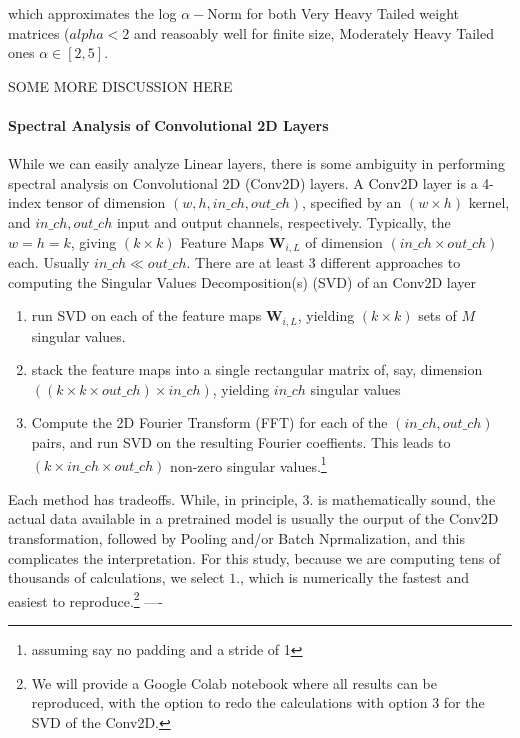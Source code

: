 which approximates the log $\alpha-$Norm for both Very Heavy Tailed weight matrices ($alpha < 2$  and reasoably well for finite size, Moderately Heavy Tailed ones $\alpha\in[2,5]$.  


SOME MORE DISCUSSION HERE

\paragraph{Spectral Analysis of Convolutional 2D Layers}
While we can easily analyze Linear layers, there is some ambiguity in performing spectral analysis on Convolutional 2D (Conv2D) layers.  A Conv2D layer is a 4-index tensor of dimension $(w,h,in\_ch,out\_ch)$, specified by an $(w\times h)$ kernel, and $in\_ch,out\_ch$ input and output channels, respectively.  Typically, the $w=h=k$, giving $(k\times k)$ Feature Maps $\mathbf{W}_{i,L}$
of dimension $(in\_ch\times out\_ch)$ each.  Usually $in\_ch\ll out\_ch$.
There are at least 3 different approaches to computing the Singular Values Decomposition(s) (SVD) of an Conv2D layer
\begin{enumerate}
\item run SVD on each of the feature maps $\mathbf{W}_{i,L}$, yielding $(k\times k)$ sets of $M$ singular values. 
\item stack the feature maps into a single rectangular matrix of, say, dimension $((k\times k\times out\_ch)\times in\_ch)$, yielding $in\_ch$ singular values
\item Compute the 2D Fourier Transform (FFT) for each of the $(in\_ch, out\_ch)$ pairs, and run SVD on the resulting Fourier coeffients\cite{Long2019}.  This leads to $(k\times in\_ch\times out\_ch)$ non-zero singular values.\footnote{assuming say no padding and a stride of 1}
\end{enumerate}

Each method has tradeoffs.  While, in principle, 3. is mathematically sound, the actual data available
in a pretrained model is usually the ourput of the Conv2D transformation, followed by Pooling and/or Batch Nprmalization,
and this complicates the interpretation.  For this study, because we are computing tens of thousands of calculations,  
we select $1.$, which is numerically the fastest and easiest to reproduce.\footnote{We will provide a Google Colab notebook where all results can be reproduced, with the option to redo the calculations with option 3 for the SVD of the Conv2D.}
----








